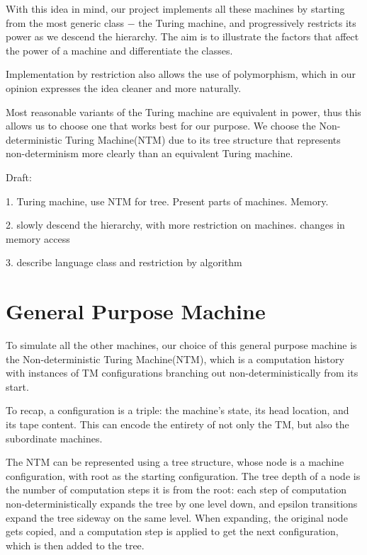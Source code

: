 \documentclass[12pt]{article}  %
\begin{document}
With this idea in mind, our project implements all these machines by starting from the most generic class $-$ the Turing machine, and progressively restricts its power as we descend the hierarchy. The aim is to illustrate the factors that affect the power of a machine and differentiate the classes. 

Implementation by restriction also allows the use of polymorphism, which in our opinion expresses the idea cleaner and more naturally.

Most reasonable variants of the Turing machine are equivalent in power, thus this allows us to choose one that works best for our purpose. We choose the Non-deterministic Turing Machine(NTM) due to its tree structure that represents non-determinism more clearly than an equivalent Turing machine.






Draft:

1. Turing machine, use NTM for tree. Present parts of machines. Memory.

2. slowly descend the hierarchy, with more restriction on machines. changes in memory access

3. describe language class and restriction by algorithm



\section{General Purpose Machine} \label{NTM}

To simulate all the other machines, our choice of this general purpose machine is the Non-deterministic Turing Machine(NTM), which is a computation history with instances of TM configurations branching out non-deterministically from its start. 

To recap, a configuration is a triple: the machine's state, its head location, and its tape content. This can encode the entirety of not only the TM, but also the subordinate machines.

The NTM can be represented using a tree structure, whose node is a machine configuration, with root as the starting configuration. The tree depth of a node is the number of computation steps it is from the root: each step of computation non-deterministically expands the tree by one level down, and epsilon transitions expand the tree sideway on the same level. When expanding, the original node gets copied, and a computation step is applied to get the next configuration, which is then added to the tree.
\end{document}
